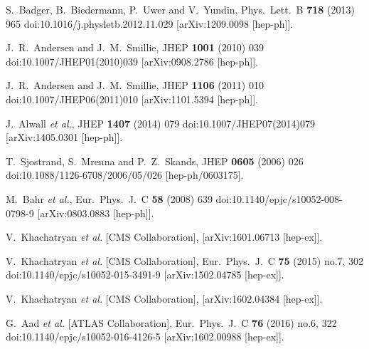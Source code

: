 \documentclass{PoS}
\begin{document}
\begin{thebibliography}{99}
  S.~Badger, B.~Biedermann, P.~Uwer and V.~Yundin,
  Phys.\ Lett.\ B {\bf 718} (2013) 965
  doi:10.1016/j.physletb.2012.11.029
  [arXiv:1209.0098 [hep-ph]].

  J.~R.~Andersen and J.~M.~Smillie,
  JHEP {\bf 1001} (2010) 039
  doi:10.1007/JHEP01(2010)039
  [arXiv:0908.2786 [hep-ph]].

  J.~R.~Andersen and J.~M.~Smillie,
  JHEP {\bf 1106} (2011) 010
  doi:10.1007/JHEP06(2011)010
  [arXiv:1101.5394 [hep-ph]].

  J.~Alwall {\it et al.},
  JHEP {\bf 1407} (2014) 079
  doi:10.1007/JHEP07(2014)079
  [arXiv:1405.0301 [hep-ph]].

  T.~Sjostrand, S.~Mrenna and P.~Z.~Skands,
  JHEP {\bf 0605} (2006) 026
  doi:10.1088/1126-6708/2006/05/026
  [hep-ph/0603175].

  M.~Bahr {\it et al.},
  Eur.\ Phys.\ J.\ C {\bf 58} (2008) 639
  doi:10.1140/epjc/s10052-008-0798-9
  [arXiv:0803.0883 [hep-ph]].

  V.~Khachatryan {\it et al.} [CMS Collaboration],
  [arXiv:1601.06713 [hep-ex]].

  V.~Khachatryan {\it et al.} [CMS Collaboration],
  Eur.\ Phys.\ J.\ C {\bf 75} (2015) no.7,  302
  doi:10.1140/epjc/s10052-015-3491-9
  [arXiv:1502.04785 [hep-ex]].

  V.~Khachatryan {\it et al.} [CMS Collaboration],
  [arXiv:1602.04384 [hep-ex]].

  G.~Aad {\it et al.} [ATLAS Collaboration],
  Eur.\ Phys.\ J.\ C {\bf 76} (2016) no.6,  322
  doi:10.1140/epjc/s10052-016-4126-5
  [arXiv:1602.00988 [hep-ex]].

















\end{thebibliography}
\end{document}
